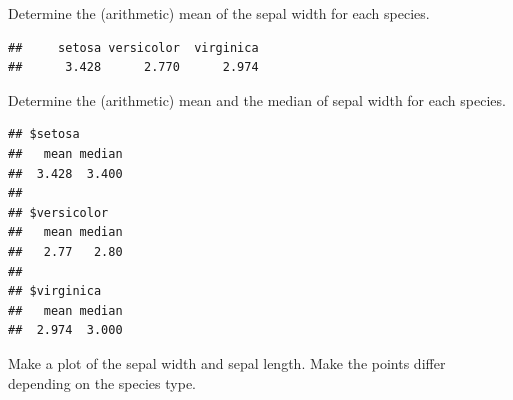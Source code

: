 \documentclass[
]{book}
\newenvironment{Shaded}{\begin{snugshade}}{\end{snugshade}}
\newcommand{\ControlFlowTok}[1]{\textcolor[rgb]{0.13,0.29,0.53}{\textbf{#1}}}
\newcommand{\DataTypeTok}[1]{\textcolor[rgb]{0.13,0.29,0.53}{#1}}
\newcommand{\KeywordTok}[1]{\textcolor[rgb]{0.13,0.29,0.53}{\textbf{#1}}}
\newcommand{\NormalTok}[1]{#1}
\newcommand{\OperatorTok}[1]{\textcolor[rgb]{0.81,0.36,0.00}{\textbf{#1}}}
\newcommand{\StringTok}[1]{\textcolor[rgb]{0.31,0.60,0.02}{#1}}
\begin{document}
Determine the (arithmetic) mean of the sepal width for each species.

\begin{Shaded}
\end{Shaded}

\begin{verbatim}
##     setosa versicolor  virginica 
##      3.428      2.770      2.974
\end{verbatim}

Determine the (arithmetic) mean and the median of sepal width for each species.

\begin{Shaded}
\end{Shaded}

\begin{verbatim}
## $setosa
##   mean median 
##  3.428  3.400 
## 
## $versicolor
##   mean median 
##   2.77   2.80 
## 
## $virginica
##   mean median 
##  2.974  3.000
\end{verbatim}

Make a plot of the sepal width and sepal length. Make the points differ depending on the species type.
\end{document}
